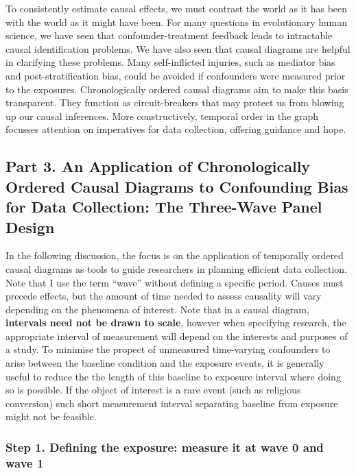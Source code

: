 \documentclass[
  singlecolumn]{article}
\begin{document}
To consistently estimate causal effects, we must contrast the world as
it has been with the world as it might have been. For many questions in
evolutionary human science, we have seen that confounder-treatment
feedback leads to intractable causal identification problems. We have
also seen that causal diagrams are helpful in clarifying these problems.
Many self-inflicted injuries, such as mediator bias and
post-stratification bias, could be avoided if confounders were measured
prior to the exposures. Chronologically ordered causal diagrams aim to
make this basis transparent. They function as circuit-breakers that may
protect us from blowing up our causal inferences. More constructively,
temporal order in the graph focusses attention on imperatives for data
collection, offering guidance and hope.

\hypertarget{part-3.-an-application-of-chronologically-ordered-causal-diagrams-to-confounding-bias-for-data-collection-the-three-wave-panel-design}{%
\subsection{Part 3. An Application of Chronologically Ordered Causal
Diagrams to Confounding Bias for Data Collection: The Three-Wave Panel
Design}\label{part-3.-an-application-of-chronologically-ordered-causal-diagrams-to-confounding-bias-for-data-collection-the-three-wave-panel-design}}

In the following discussion, the focus is on the application of
temporally ordered causal diagrams as tools to guide researchers in
planning efficient data collection. Note that I use the term ``wave''
without defining a specific period. Causes must precede effects, but the
amount of time needed to assess causality will vary depending on the
phenomena of interest. Note that in a causal diagram, \textbf{intervals
need not be drawn to scale}, however when specifying research, the
appropriate interval of measurement will depend on the interests and
purposes of a study. To minimise the propect of unmeasured time-varying
confounders to arise between the baseline condition and the exposure
events, it is generally useful to reduce the the length of this baseline
to exposure interval where doing so is possible. If the object of
interest is a rare event (such as religious conversion) such short
measurement interval separating baseline from exposure might not be
feasible.

\hypertarget{step-1.-defining-the-exposure-measure-it-at-wave-0-and-wave-1}{%
\subsubsection{Step 1. Defining the exposure: measure it at wave 0 and
wave
1}\label{step-1.-defining-the-exposure-measure-it-at-wave-0-and-wave-1}}
\end{document}
